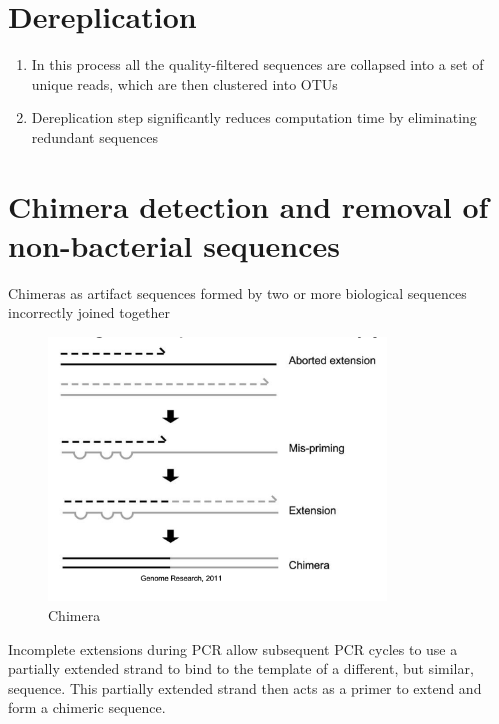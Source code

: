 \documentclass[
]{book}
\providecommand{\tightlist}{%
  \setlength{\itemsep}{0pt}\setlength{\parskip}{0pt}}
\begin{document}
\hypertarget{dereplication}{%
\section{Dereplication}\label{dereplication}}

\begin{enumerate}
\def\labelenumi{\arabic{enumi}.}
\tightlist
\item
  In this process all the quality-filtered sequences are collapsed into a set of unique reads, which are then clustered into OTUs
\item
  Dereplication step significantly reduces computation time by eliminating redundant sequences
\end{enumerate}

\hypertarget{chimera-detection-and-removal-of-non-bacterial-sequences}{%
\section{Chimera detection and removal of non-bacterial sequences}\label{chimera-detection-and-removal-of-non-bacterial-sequences}}

Chimeras as artifact sequences formed by two or more biological sequences incorrectly joined together

\begin{figure}
\centering
\includegraphics[width=0.8\textwidth,height=\textheight]{./Figures/Chimera.png}
\caption{Chimera}
\end{figure}

Incomplete extensions during PCR allow subsequent PCR cycles to use a partially extended strand to bind to the template of a different, but similar, sequence. This partially extended strand then acts as a primer to extend and form a chimeric sequence.
\end{document}
